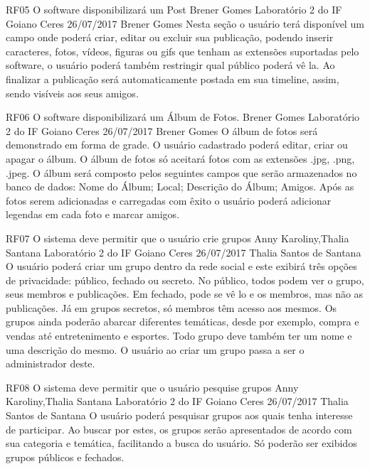  \requisitoFuncional
 {RF05}
 {O software disponibilizará um Post}
 {Brener Gomes}
 {Laboratório 2 do IF Goiano Ceres}
 {26/07/2017}
 {Brener Gomes}
 {Nesta seção o usuário terá disponível um campo onde poderá criar, editar ou excluir sua publicação, podendo inserir caracteres, fotos, vídeos, figuras ou gifs que tenham as extensões suportadas pelo software, o usuário poderá também restringir qual público poderá vê la. Ao finalizar a publicação será automaticamente postada em sua timeline, assim, sendo visíveis aos seus amigos.
 }
 
 \requisitoFuncional
 {RF06}
 {O software disponibilizará um Álbum de Fotos.}
 {Brener Gomes}
 {Laboratório 2 do IF Goiano Ceres}
 {26/07/2017}
 {Brener Gomes}
 {O álbum de fotos será demonstrado em forma de grade. O usuário cadastrado poderá editar, criar ou apagar o álbum. O álbum de fotos só aceitará fotos com as extensões .jpg, .png, .jpeg. O álbum será composto pelos seguintes campos que serão armazenados no banco de dados:
  Nome do Álbum;
  Local;
  Descrição do Álbum;
  Amigos.
 Após as fotos serem adicionadas e carregadas com êxito o usuário poderá adicionar legendas em cada foto e marcar amigos.
 }
 
 \requisitoFuncional
 {RF07}
 {O sistema deve permitir que o usuário crie grupos}
 {Anny Karoliny,Thalia Santana}
 {Laboratório 2 do IF Goiano Ceres}
 {26/07/2017}
 {Thalia Santos de Santana}
 {O usuário poderá criar um grupo dentro da rede social e este exibirá três opções de privacidade: público, fechado ou secreto. No público, todos podem ver o grupo, seus membros e publicações. Em fechado, pode se vê lo e os membros, mas não as publicações. Já em grupos secretos, só membros têm acesso aos mesmos. Os grupos ainda poderão abarcar diferentes temáticas, desde por exemplo, compra e vendas até entretenimento e esportes. Todo grupo deve também ter um nome e uma descrição do mesmo. O usuário ao criar um grupo passa a ser o administrador deste.
 }
 
 \requisitoFuncional
 {RF08}
 {O sistema deve permitir que o usuário pesquise grupos}
 {Anny Karoliny,Thalia Santana}
 {Laboratório 2 do IF Goiano Ceres}
 {26/07/2017}
 {Thalia Santos de Santana}
 {O usuário poderá pesquisar grupos aos quais tenha interesse de participar. Ao buscar por estes, os grupos serão apresentados de acordo com sua categoria e temática, facilitando a busca do usuário. Só poderão ser exibidos grupos públicos e fechados.
 }
 

